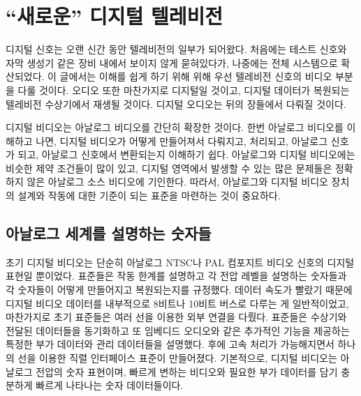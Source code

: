 \chapter{``새로운'' 디지털 텔레비전}
디지털 신호는 오랜 신간 동안 텔레비전의 일부가 되어왔다. 처음에는 테스트 신호와 자막 생성기 같은 장비 내에서 보이지 않게 묻혀있다가, 나중에는 전체 시스템으로 확산되었다.
이 글에서는 이해를 쉽게 하기 위해 위해 우선 텔레비전 신호의 비디오 부분을 다룰 것이다.
오디오 또한 마찬가지로 디지털일 것이고, 디지털 데이터가 복원되는 텔레비전 수상기에서 재생될 것이다. 디지털 오디오는 뒤의 장들에서 다뤄질 것이다.


디지털 비디오는 아날로그 비디오를 간단히 확장한 것이다. 한번 아날로그 비디오를 이해하고 나면, 디지털 비디오가 어떻게 만들어져서 다뤄지고, 처리되고, 아날로그 신호가 되고, 아날로그 신호에서 변환되는지 이해하기 쉽다.
아날로그와 디지털 비디오에는 비슷한 제약 조건들이 많이 있고, 디지털 영역에서 발생할 수 있는 많은 문제들은 정확하지 않은 아날로그 소스 비디오에 기인한다.
따라서, 아날로그와 디지털 비디오 장치의 설계와 작동에 대한 기준이 되는 표준을 마련하는 것이 중요하다.

\section{아날로그 세계를 설명하는 숫자들}
초기 디지털 비디오는 단순히 아날로그 NTSC나 PAL 컴포지트 비디오 신호의 디지털 표현일 뿐이었다.
표준들은 작동 한계를 설명하고 각 전압 레벨을 설명하는 숫자들과 각 숫자들이 어떻게 만들어지고 복원되는지를 규정했다.
데이터 속도가 빨랐기 때문에 디지털 비디오 데이터를 내부적으로 8비트나 10비트 버스로 다루는 게 일반적이었고, 마찬가지로 초기 표준들은 여러 선을 이용한 외부 연결을 다뤘다.
표준들은 수상기와 전달된 데이터들을 동기화하고 또 임베디드 오디오와 같은 추가적인 기능을 제공하는 특정한 부가 데이터와 관리 데이터들을 설명했다.
후에 고속 처리가 가능해지면서 하나의 선을 이용한 직렬 인터페이스 표준이 만들어졌다.
기본적으로, 디지털 비디오는 아날로그 전압의 숫자 표현이며, 빠르게 변하는 비디오와 필요한 부가 데이터를 담기 충분하게 빠르게 나타나는 숫자 데이터들이다.

